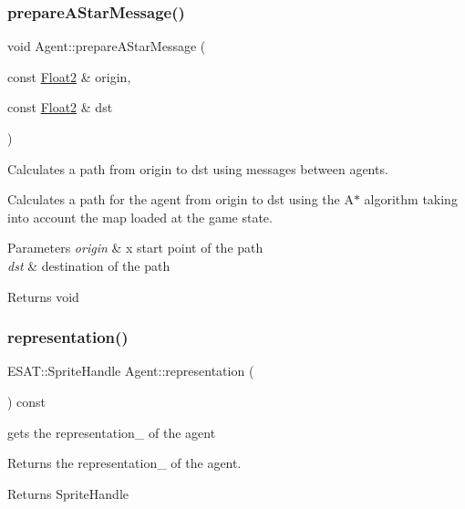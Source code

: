 \subsubsection{\texorpdfstring{prepare\+A\+Star\+Message()}{prepareAStarMessage()}}
{\footnotesize\ttfamily void Agent\+::prepare\+A\+Star\+Message (\begin{DoxyParamCaption}\item[{const \mbox{\hyperlink{class_float2}{Float2}} \&}]{origin,  }\item[{const \mbox{\hyperlink{class_float2}{Float2}} \&}]{dst }\end{DoxyParamCaption})}



Calculates a path from origin to dst using messages between agents. 

Calculates a path for the agent from origin to dst using the A$\ast$ algorithm taking into account the map loaded at the game state.


\begin{DoxyParams}{Parameters}
{\em origin} & x start point of the path \\
\hline
{\em dst} & destination of the path \\
\hline
\end{DoxyParams}
\begin{DoxyReturn}{Returns}
void 
\end{DoxyReturn}
\mbox{\label{class_agent_a5ef49d1f2efe42bb70339c30c82789ce}} 
\subsubsection{\texorpdfstring{representation()}{representation()}}
{\footnotesize\ttfamily E\+S\+A\+T\+::\+Sprite\+Handle Agent\+::representation (\begin{DoxyParamCaption}{ }\end{DoxyParamCaption}) const}



gets the representation\+\_\+ of the agent 

Returns the representation\+\_\+ of the agent.

\begin{DoxyReturn}{Returns}
Sprite\+Handle 
\end{DoxyReturn}
\mbox{\label{class_agent_a1213f4de6f642d4a0823685ed642068b}} 
